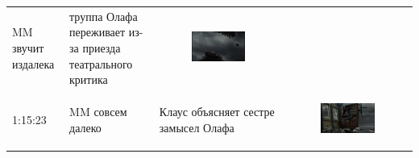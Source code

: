 \begin{longtable}[]{@{}llll@{}}
\begin{minipage}[t]{0.20\columnwidth}
MM звучит издалека\strut
\end{minipage} & \begin{minipage}[t]{0.27\columnwidth}\raggedright\strut
труппа Олафа переживает
из-за приезда театрального
критика\strut
\end{minipage} & \begin{minipage}[t]{0.27\columnwidth}\raggedright\strut
\begin{figure}
\centering
\includegraphics{IMG/LS_HH_BB.png}
\caption{}
\end{figure}
\strut
\end{minipage}\tabularnewline
\begin{minipage}[t]{0.15\columnwidth}\raggedright\strut
1:15:23\strut
\end{minipage} & \begin{minipage}[t]{0.20\columnwidth}\raggedright\strut
MM совсем далеко\strut
\end{minipage} & \begin{minipage}[t]{0.27\columnwidth}\raggedright\strut
Клаус объясняет сестре
замысел Олафа\strut
\end{minipage} & \begin{minipage}[t]{0.27\columnwidth}\raggedright\strut
\begin{figure}
\centering
\includegraphics{IMG/LS_HH_euristic.png}

\end{figure}
\end{minipage}
\end{longtable}
